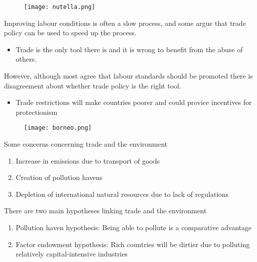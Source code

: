 \documentclass{beamer}
\begin{document}
\begin{frame}
  \begin{figure}
    \texttt{[image: nutella.png]}
  \end{figure}
\end{frame}


\begin{frame}
  Improving labour conditions is often a slow process, and some argue that trade policy can be used to speed up the process.
  \begin{itemize}
   \item Trade is the only tool there is and it is wrong to benefit from the abuse of others.
  \end{itemize}
  \medskip
  However, although most agree that labour standards should be promoted there is disagreement about whether trade policy is the right tool.
  \begin{itemize}
    \item Trade restrictions will make countries poorer and could provice incentives for protectionism
  \end{itemize}
\end{frame}

\begin{frame}
  \begin{figure}
    \texttt{[image: borneo.png]}
  \end{figure}
\end{frame}

\begin{frame}
 Some concerns concerning trade and the environment
 \begin{enumerate}
   \item Increase in emissions due to transport of goods
   \item Creation of pollution havens
   \item Depletion of international natural resources due to lack of regulations
 \end{enumerate}
\end{frame}

\begin{frame}
  There are two main hypotheses linking trade and the environment
  \begin{enumerate}
    \item Pollution haven hypothesis: Being able to pollute is a comparative advantage
    \item Factor endowment hypothesis: Rich countries will be dirtier due to polluting relatively capital-intensive industries
  \end{enumerate}
\end{frame}
\end{document}
